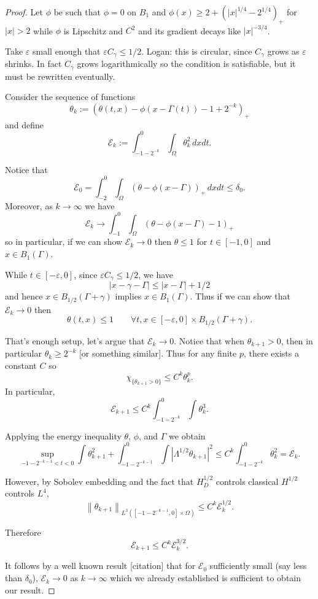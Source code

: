 \documentclass[11pt]{amsart}
\theoremstyle{remark}
\newcommand{\E}{\mathcal{E}}
\newcommand{\eps}{\varepsilon}
\newcommand{\norm}[1]{\left\lVert#1\right\rVert}
\newcommand{\paren}[1]{\left( #1 \right)}
\newcommand{\abs}[1]{\left\lvert #1 \right\rvert}
\newcommand{\indic}[1]{\chi_{\{#1\}}}
\begin{document}
\begin{proof}
Let $\phi$ be such that $\phi = 0$ on $B_1$ and $\phi(x) \geq 2 + \paren{|x|^{1/4}-2^{1/4}}_+$ for $|x|>2$ while $\phi$ is Lipschitz and $C^2$ and its gradient decays like $|x|^{-3/4}$.  

Take $\eps$ small enough that $\eps C_\gamma \leq 1/2$.  Logan: this is circular, since $C_\gamma$ grows as $\eps$ shrinks.  In fact $C_\gamma$ grows logarithmically so the condition is satisfiable, but it must be rewritten eventually. 

Consider the sequence of functions
\[ \theta_k := (\theta(t,x) - \phi(x - \Gamma(t)) - 1 + 2^{-k})_+ \]
and define
\[ \E_k := \int_{-1-2^{-k}}^0 \int_\Omega \theta_k^2 \,dxdt. \]

Notice that
\[ \E_0 = \int_{-2}^0 \int_\Omega (\theta - \phi(x-\Gamma))_+ \,dxdt \leq \delta_0. \]
Moreover, as $k \to \infty$ we have
\[ \E_k \to \int_{-1}^0 \int_\Omega (\theta - \phi(x-\Gamma) - 1)_+ \]
so in particular, if we can show $\E_k \to 0$ then $\theta \leq 1$ for $t \in [-1,0]$ and $x \in B_1(\Gamma)$.  

While $t \in [-\eps, 0]$, since $\eps C_\gamma \leq 1/2$, we have
\[ |x - \gamma - \Gamma| \leq |x-\Gamma| + 1/2 \]
and hence $x \in B_{1/2}(\Gamma+\gamma)$ implies $x \in B_1(\Gamma)$.  Thus if we can show that $\E_k \to 0$ then
\[ \theta(t,x) \leq 1 \qquad \forall t,x \in [-\eps,0]\times B_{1/2}(\Gamma+\gamma). \]

That's enough setup, let's argue that $\E_k \to 0$.  Notice that when $\theta_{k+1}>0$, then in particular $\theta_k \geq 2^{-k}$ [or something similar].  Thus for any finite $p$, there exists a constant $C$ so
\[ \indic{\theta_{k+1}>0} \leq C^k \theta_k^p. \]
In particular,
\[ \E_{k+1} \leq C^k \int_{-1-2^{-k}}^0 \int \theta_k^3. \]

Applying the energy inequality $\theta$, $\phi$, and $\Gamma$ we obtain
\[ \sup_{-1-2^{-k-1}<t<0} \int \theta_{k+1}^2 + \int_{-1-2^{-k-1}}^0 \int \abs{\Lambda^{1/2}\theta_{k+1}}^2 \leq C^k \int_{-1-2^{-k}}^0 \theta_k^2 = \E_k. \]

However, by Sobolev embedding and the fact that $H_D^{1/2}$ controls classical $H^{1/2}$ controls $L^4$,
\[ \norm{\theta_{k+1}}_{L^3([-1-2^{-k-1},0]\times\Omega)} \leq C^k \E_k^{1/2}. \]

Therefore
\[ \E_{k+1} \leq C^k \E_k^{3/2}. \]

It follows by a well known result [citation] that for $\E_0$ sufficiently small (say less than $\delta_0$), $\E_k \to 0$ as $k \to \infty$ which we already established is sufficient to obtain our result.  
\end{proof}
\end{document}
